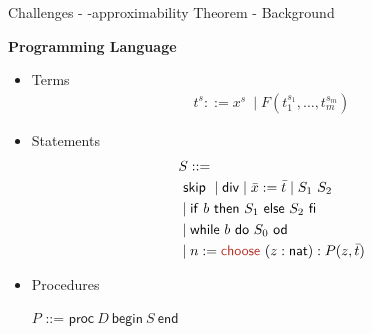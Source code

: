 
\begin{frame}{Challenges - \WhileCC-approximability Theorem - Background}
    \pause
    \footnotesize
    \begin{minipage}[t]{0.33\linewidth}
        \vspace{0.05em}
        \textbf{\color{Blue}{\WhileCC} Programming Language}
        {\textcolor{OliveGreen}{\textbf{ }}}
         \begin{itemize}
                \vspace{0.5em}
                \pause \item Terms
                \vspace{-0.5em}
                        \begin{align*}
                         t^s ::= x^s\ \mid F(t_1^{s_1}, \ldots , t_m^{s_m})
                        \end{align*}
                \vspace{-2.7em}
                \pause \item Statements
                \vspace{-0.5em}
                    \begin{align*}
                        &S ::=\\
                                &\ \mathsf{skip}\
                                \mid \mathsf{div}
                                \mid \bar{x} := \bar{t}
                                \mid S_1\ S_2\\
                                &\mid \mathsf{if}\ b \ \mathsf{then}\ S_1 \ \mathsf{else}\ S_2\ \mathsf{fi}\ \\
                                &\mid \mathsf{while}\ b\ \mathsf{do}\ S_0\ \mathsf{od}
                                \\
                                &\mid n:= \textcolor{BrickRed}{\mathsf{choose\ }} (z: \nat): P(z,\bar{t})
                    \end{align*}
                \vspace{-1.7em}
                \pause \item Procedures
                    \begin{center}
                        $P$ ::= $\mathsf{proc} \ D\ \mathsf{begin}\ S\ \mathsf{end}$
                    \end{center}
                        

\end{itemize}
\end{minipage}
\end{frame}
